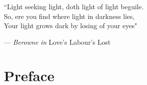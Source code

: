 \documentclass[openany,twoside,frontopenright,chaprunninghead]{ip3thesis}
\begin{document}
\begin{epigraph*}
% 
% 


``Light seeking light, doth light of light beguile. \\So, ere you find where light in darkness lies, \\ Your light grows dark by losing of your eyes"

\flushright --- \emph{Berowne in} Love's Labour's Lost
\end{epigraph*} 

\chapter*{Preface}
\end{document}
